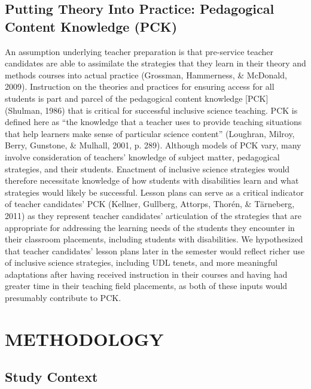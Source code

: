 \documentclass[11.5pt]{sig-alternate} %
\begin{document}
\begin{large}
\subsection*{Putting Theory Into Practice: Pedagogical Content Knowledge (PCK)}

An assumption underlying teacher preparation is that pre-service teacher candidates are able to assimilate the strategies that they learn in their theory and methods courses into actual practice (Grossman, Hammerness, \& McDonald, 2009).  Instruction on the theories and practices for ensuring access for all students is part and parcel of the pedagogical content knowledge [PCK] (Shulman, 1986) that is critical for successful inclusive science teaching.  PCK is defined here as “the knowledge that a teacher uses to provide teaching situations that help learners make sense of particular science content” (Loughran, Milroy, Berry, Gunstone, \& Mulhall, 2001, p. 289). Although models of PCK vary, many involve consideration of teachers’ knowledge of subject matter, pedagogical strategies, and their students.  Enactment of inclusive science strategies would therefore necessitate knowledge of how students with disabilities learn and what strategies would likely be successful. Lesson plans can serve as a critical indicator of teacher candidates’ PCK (Kellner, Gullberg, Attorps, Thorén, \& Tärneberg, 2011) as they represent teacher candidates’ articulation of the strategies that are appropriate for addressing the learning needs of the students they encounter in their classroom placements, including students with disabilities. We hypothesized that teacher candidates’ lesson plans later in the semester would reflect richer use of inclusive science strategies, including UDL tenets, and more meaningful adaptations after having received instruction in their courses and having had greater time in their teaching field placements, as both of these inputs would presumably contribute to PCK.

\section*{METHODOLOGY}

\subsection*{Study Context}


\end{large}
\end{document}
